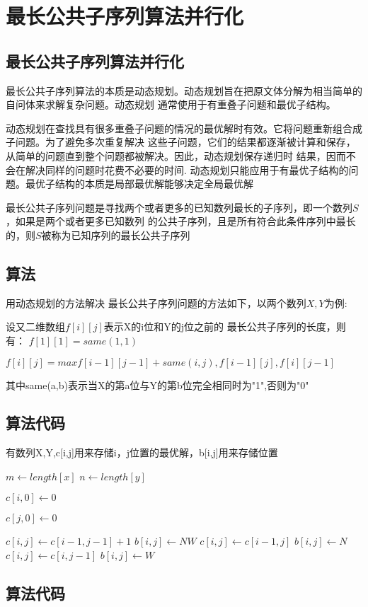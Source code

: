 
\chapter[最长公共子序列算法并行化]{最长公共子序列算法并行化}
\section{最长公共子序列算法并行化}

    最长公共子序列算法的本质是动态规划。动态规划旨在把原文体分解为相当简单的自问体来求解复杂问题。动态规划
通常使用于有重叠子问题和最优子结构。

    动态规划在查找具有很多重叠子问题的情况的最优解时有效。它将问题重新组合成子问题。为了避免多次重复解决
这些子问题，它们的结果都逐渐被计算和保存，从简单的问题直到整个问题都被解决。因此，动态规划保存递归时
结果，因而不会在解决同样的问题时花费不必要的时间. 动态规划只能应用于有最优子结构的问题。最优子结构的本质是局部最优解能够决定全局最优解   

    最长公共子序列问题是寻找两个或者更多的已知数列最长的子序列，即一个数列$S$，如果是两个或者更多已知数列
的公共子序列，且是所有符合此条件序列中最长的，则$S$被称为已知序列的最长公共子序列 


\section{算法}
用动态规划的方法解决 最长公共子序列问题的方法如下，以两个数列$X,Y$为例:

设又二维数组$f[i][j]$表示X的i位和Y的j位之前的 最长公共子序列的长度，则有：
    $f[1][1]=same(1,1)$

    $f[i][j]=max{f[i-1][j-1]+same(i,j),f[i-1][j],f[i][j-1]}$

其中same(a,b)表示当X的第a位与Y的第b位完全相同时为"1",否则为"0"

\section{算法代码}

    有数列X,Y,c[i,j]用来存储i，j位置的最优解，b[i,j]用来存储位置

\begin{algorithmic}
    
    \State $m \gets length[x]$
    \State $n \gets length[y]$

    \State  $c[i,0] \gets 0 $ 
    \EndFor

    \State  $c[j,0] \gets 0 $ 
    \EndFor

                \State $c[i,j] \gets c[i-1,j-1] +1$
                \State $b[i,j] \gets NW$
                \State $c[i,j] \gets c[i-1,j]$
                \State $b[i,j] \gets N$
            \Else {}
                \State $c[i,j] \gets c[i,j-1]$
                \State $b[i,j] \gets W$
            \EndIf
        \EndFor{}
    \EndFor{}


\end{algorithmic}
\section{算法代码}

